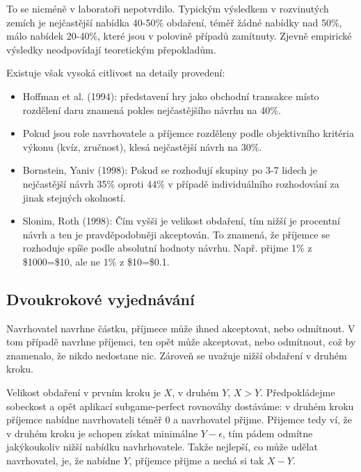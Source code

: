 \documentclass[a5paper,12pt]{article}
\begin{document}
      To se nicméně v laboratoři nepotvrdilo. Typickým výsledkem v rozvinutých zemích je nejčastější
      nabídka 40-50\% obdaření, téměř žádné nabídky nad 50\%, málo nabídek 20-40\%, které jsou v polovině
      případů zamítnuty. Zjevně empirické výsledky neodpovídají teoretickým přepokladům.

      Existuje však vysoká citlivost na detaily provedení:
      \begin{itemize}
        \item 
          Hoffman et al. (1994): 
          představení hry jako obchodní transakce místo rozdělení daru znamená pokles nejčastějšího návrhu na 40\%.
        \item 
          Pokud jsou role navrhovatele a příjemce rozděleny podle objektivního kritéria výkonu (kvíz, zručnost), 
          klesá nejčastější návrh na 30\%.
        \item
          Bornstein, Yaniv (1998):
          Pokud se rozhodují skupiny po 3-7 lidech je nejčastější návrh 35\% oproti 44\% v případě individuálního
          rozhodování za jinak stejných okolností.
        \item
          Slonim, Roth (1998):
          Čím vyšši je velikost obdaření, tím nižší je procentní návrh a ten je pravděpodobněji akceptován.
          To znamená, že příjemce se rozhoduje spíše podle absolutní hodnoty návrhu. Např. přijme 1\% z \$1000=\$10,
          ale ne 1\% z \$10=\$0.1.

      \end{itemize}
    \subsection{Dvoukrokové vyjednávání}
      Navrhovatel navrhne částku, příjmece může ihned akceptovat, nebo odmítnout. V tom případě navrhne příjemci,
      ten opět může akceptovat, nebo odmítnout, což by znamenalo, že nikdo nedostane nic.
      Zároveň se uvažuje nižší obdaření v druhém kroku.

      Velikost obdaření v prvním kroku je $X$, v druhém $Y$, $X>Y$. Předpokládejme sobeckost a opět aplikací
      subgame-perfect rovnováhy dostáváme: v druhém kroku příjemce nabídne navrhovateli téměř 0 a navrhovatel přijme.
      Přijemce tedy ví, že v druhém kroku je schopen získat minimálne $Y-\epsilon$, tím pádem odmítne jakýkoukoliv
      nižší nabídku navhrhovatele. Takže nejlepší, co může udělat navrhovatel, je, že nabídne $Y$, příjemce přijme a
      nechá si tak $X-Y$.
\end{document}
